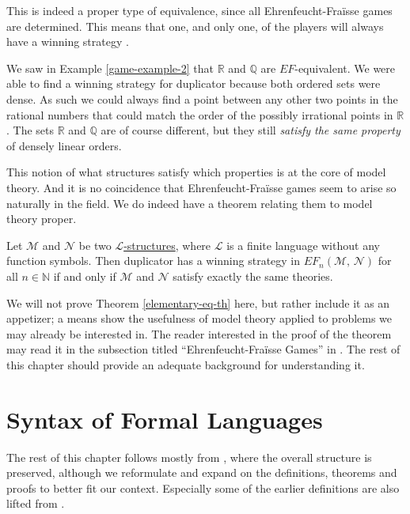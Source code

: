 \documentclass[../../main.tex]{subfiles}
\begin{document}
This is indeed a proper type of equivalence, since all Ehrenfeucht-Fra\"isse games are determined.
This means that one, and only one, of the players will always have a winning strategy \cite[\S 6]{Wil24}.

We saw in Example \ref{game-example-2} that $\mathbb{R}$ and $\mathbb{Q}$ are $EF$-equivalent.
We were able to find a winning strategy for duplicator because both ordered sets were dense. 
As such we could always find a point between any other two points in the rational numbers that could match the order of the possibly irrational points in $\mathbb{R}$.
The sets $\mathbb{R}$ and $\mathbb{Q}$ are of course different, but they still \textit{satisfy the same property} of densely linear orders.

This notion of what structures satisfy which properties is at the core of model theory.
And it is no coincidence that Ehrenfeucht-Fra\"isse games seem to arise so naturally in the field. 
We do indeed have a theorem relating them to model theory proper.

\begin{theorem}\label{elementary-eq-th}\cite[Theorem 2.4.6]{Mar02}
    Let $\mathcal{M}$ and $\mathcal{N}$ be two \hyperref[structure-def]{$\mathcal{L}$-structures}, where $\mathcal{L}$ is a finite language without any function symbols.
    Then duplicator has a winning strategy in $EF_n(\mathcal{M},\, \mathcal{N})$ for all $n \in \mathbb{N}$ if and only if $\mathcal{M}$ and $\mathcal{N}$ satisfy exactly the same theories.
\end{theorem}
 
We will not prove Theorem \ref{elementary-eq-th} here, but rather include it as an appetizer;
a means show the usefulness of model theory applied to problems we may already be interested in.
The reader interested in the proof of the theorem may read it in the subsection titled ``Ehrenfeucht-Fra\"isse Games'' in \cite[\S 2.4]{Mar02}.
The rest of this chapter should provide an adequate background for understanding it.
 
\section{Syntax of Formal Languages}
The rest of this chapter follows mostly from \cite[\S\S 1.3, 1.4, 2.1]{Cha90}, where the overall structure is preserved, 
although we reformulate and expand on the definitions, theorems and proofs to better fit our context.
Especially some of the earlier definitions are also lifted from \cite{Mar02}.
\end{document}
